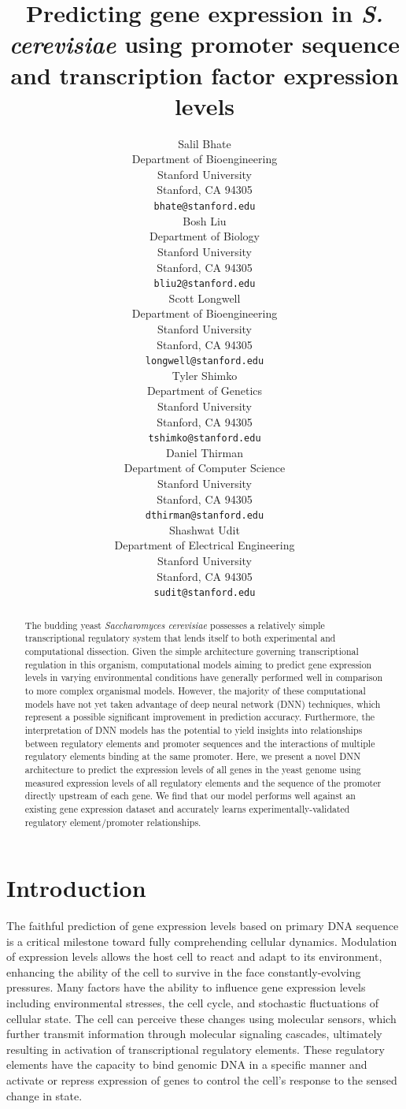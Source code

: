 \documentclass{article}
\title{Predicting gene expression in \textit{S. cerevisiae} using promoter sequence and transcription factor expression levels}
\author{
  Salil Bhate \\
  Department of Bioengineering\\
  Stanford University\\
  Stanford, CA 94305 \\
  \texttt{bhate@stanford.edu} \\
  \And
  Bosh Liu \\
  Department of Biology\\
  Stanford University\\
  Stanford, CA 94305 \\
  \texttt{bliu2@stanford.edu} \\
  \AND
  Scott Longwell \\
  Department of Bioengineering\\
  Stanford University\\
  Stanford, CA 94305 \\
  \texttt{longwell@stanford.edu} \\
  \And
  Tyler Shimko \\
  Department of Genetics\\
  Stanford University\\
  Stanford, CA 94305 \\
  \texttt{tshimko@stanford.edu} \\
  \And
  Daniel Thirman \\
  Department of Computer Science\\
  Stanford University\\
  Stanford, CA 94305 \\
  \texttt{dthirman@stanford.edu} \\
  \And
  Shashwat Udit \\
  Department of Electrical Engineering\\
  Stanford University\\
  Stanford, CA 94305 \\
  \texttt{sudit@stanford.edu} \\
}
\begin{document}
\maketitle

\begin{abstract}

The budding yeast \textit{Saccharomyces cerevisiae} possesses a relatively simple transcriptional regulatory system that lends itself to both experimental and computational dissection. Given the simple architecture governing transcriptional regulation in this organism, computational models aiming to predict gene expression levels in varying environmental conditions have generally performed well in comparison to more complex organismal models. However, the majority of these computational models have not yet taken advantage of deep neural network (DNN) techniques, which represent a possible significant improvement in prediction accuracy. Furthermore, the interpretation of DNN models has the potential to yield insights into relationships between regulatory elements and promoter sequences and the interactions of multiple regulatory elements binding at the same promoter. Here, we present a novel DNN architecture to predict the expression levels of all genes in the yeast genome using measured expression levels of all regulatory elements and the sequence of the promoter directly upstream of each gene. We find that our model performs well against an existing gene expression dataset and accurately learns experimentally-validated regulatory element/promoter relationships.
  
\end{abstract}

\section{Introduction}

The faithful prediction of gene expression levels based on primary DNA sequence is a critical milestone toward fully comprehending cellular dynamics. Modulation of expression levels allows the host cell to react and adapt to its environment, enhancing the ability of the cell to survive in the face constantly-evolving pressures. Many factors have the ability to influence gene expression levels including environmental stresses, the cell cycle, and stochastic fluctuations of cellular state. The cell can perceive these changes using molecular sensors, which further transmit information through molecular signaling cascades, ultimately resulting in activation of transcriptional regulatory elements. These regulatory elements have the capacity to bind genomic DNA in a specific manner and activate or repress expression of genes to control the cell's response to the sensed change in state.
\end{document}
